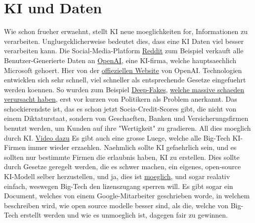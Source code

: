 \documentclass{report}
\begin{document}
\section{KI und Daten}
Wie schon frueher erwaehnt, stellt KI neue moeglichkeiten for, Informationen zu verarbeiten. Ungluegcklicherweise bedeutet dies, dass eine KI Daten viel besser verarbeiten kann.
Die Social-Media-Platform \hyperlink{reddit.com}{Reddit} zum Beispiel verkauft alle Benutzer-Generierte Daten an \hyperlink{https://openai.com/}{OpenAI}, eine KI-firma, welche hauptsaechlich Microsoft gehoert.
Hier von der \hyperlink{https://openai.com/index/openai-and-reddit-partnership/}{offieziellen Website} von OpenAI. 
\newline
\newline
Technologien entwicklen sich sehr schnell, viel schneller als entsprechende Gesetze eingefuehrt werden koennen. So wurden zum Beispiel \hyperlink{https://en.wikipedia.org/wiki/Deepfake}{Deep-Fakes}, \hyperlink{https://edition.cnn.com/2024/05/16/tech/arup-deepfake-scam-loss-hong-kong-intl-hnk/index.html}{welche massive schaeden verursacht haben}, erst vor kurzen von Politikern als Problem anerkannt.
\newline
\newline
Das schockierendste ist, das es schon jetzt Socia-Credit-Scores gibt, die nicht von einem Diktaturstaat, sondern von Geschaeften, Banken und Versicherungsfirmen benutzt werden, um Kunden auf ihre "Wertigkeit" zu gradieren. All dies moeglich durch KI.
\hyperlink{https://youtube.com/watch?v=VUhKTngpd8c}{Video dazu}
\newline
\newline
Es gibt auch eine grosse Luege, welche alle Big-Tech KI-Firmen immer wieder erzaehlen. Naehmlich sollte KI gefaehrlich sein, und es sollten nur bestimmte Firmen die erlaubnis haben, KI zu erstellen. Dies sollte durch Gesetze geregelt werden, die es schwer machen, ein eigenes, open-source KI-Modell selber herzustellen, und ja, dies ist \hyperlink{https://youtube.com/watch?v=188fipF-i5I}{moeglich}, und sogar realativ einfach, weswegen Big-Tech den lizenszugang sperren will.
\newline
Es gibt sogar ein Document, welches von einem Google-Mitarbeiter geschrieben worde, in welchem beschreiben wird, wie open source modelle besser sind, als die, welche von Big-Tech erstellt werden und wie es unmoeglich ist, dagegen fair zu gewinnen.
\printbibliography
\end{document}
